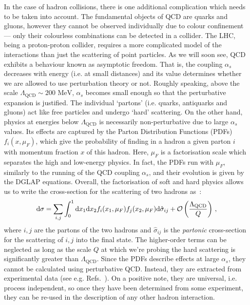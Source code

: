 \documentclass[main.tex]{subfiles}
\begin{document}
In the case of hadron collisions, there is one additional complication which needs to be taken into account. The fundamental objects of QCD are quarks and gluons, however they cannot be observed individually due to colour confinement --- only their colourless combinations can be detected in a collider. The LHC, being a proton-proton collider, requires a more complicated model of the interactions than just the scattering of point particles. As we will soon see, QCD exhibits a behaviour known as asymptotic freedom. That is, the coupling $\alpha_s$ decreases with energy (i.e. at small distances) and its value determines whether we are allowed to use perturbation theory or not. Roughly speaking, above the scale $\Lambda_\text{QCD} \sim 200 \text{ MeV}$, $\alpha_s$ becomes small enough so that the perturbative expansion is justified. The individual `partons' (i.e. quarks, antiquarks and gluons) act like free particles and undergo `hard' scattering\cite{PhysRevLett.23.1415}. On the other hand, physics at energies below $\Lambda_\text{QCD}$ is necessarily non-perturbative due to large $\alpha_s$ values. Its effects are captured by the Parton Distribution Functions (PDFs) $f_i(x, \mu_F)$, which give the probability of finding in a hadron a given parton $i$ with momentum fraction $x$ of this hadron. Here, $\mu_F$ is a factorisation scale which separates the high and low-energy physics. In fact, the PDFs run with $\mu_F$, similarly to the running of the QCD coupling $\alpha_s$, and their evolution is given by the DGLAP equations.
Overall, the factorisation of soft and hard physics allows us to write the cross-section for the scattering of two hadrons as~\cite{Collins:1989gx}:
\begin{equation} \label{eq:factorisation}
    \mathrm{d} \sigma = \sum_{i,j} \int_0^1 \mathrm{d} x_1 \mathrm{d} x_2 f_i(x_1, \mu_F) f_j(x_2, \mu_F) \mathrm{d} \hat{\sigma}_{ij} + \mathcal{O}\left(\frac{\Lambda_\text{QCD}}{Q}\right)\,,
\end{equation}
where $i, j$ are the partons of the two hadrons and $\hat{\sigma}_{ij}$ is the \textit{partonic} cross-section for the scattering of $i,j$ into the final state. The higher-order terms can be neglected as long as the scale $Q$ at which we're probing the hard scattering is significantly greater than $\Lambda_{\text{QCD}}$. Since the PDFs describe effects at large $\alpha_s$, they cannot be calculated using perturbative QCD. Instead, they are extracted from experimental data (see e.g. Refs.~\cite{H1:2015ubc, Alekhin:2017kpj, Hou:2019efy, NNPDF:2021uiq, Buckley:2014ana}). On a positive note, they are universal, i.e. process independent, so once they have been determined from some experiment, they can be re-used in the description of any other hadron interaction. 
\end{document}
